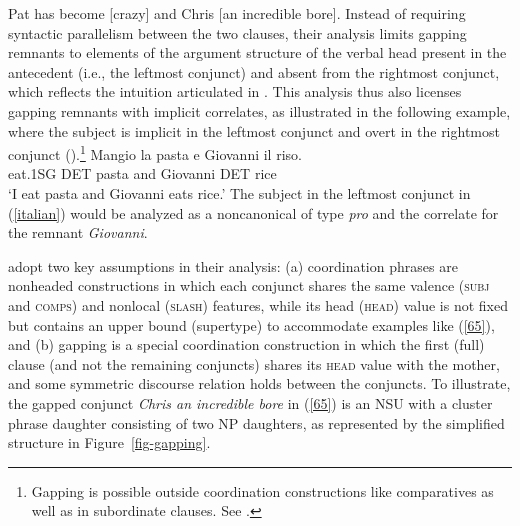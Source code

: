 \ea Pat has become [crazy] and Chris [an incredible bore]. \citep[248]{Abeille2014}  \label{65}\z
%
Instead of requiring %
syntactic parallelism between the two clauses, their analysis limits gapping remnants to elements of the argument structure of the verbal head present in the antecedent (i.e., the leftmost conjunct) and absent from the rightmost conjunct, which reflects the intuition articulated in \citet{Hankamer1971}. This analysis thus also licenses gapping remnants with implicit correlates, as illustrated in the
following  example, where the subject is implicit in the leftmost conjunct and overt in the rightmost conjunct (\citealt[251]{Abeille2014}).\footnote{Gapping is possible outside coordination
constructions like comparatives as well as in 
subordinate clauses. See .}
\ea
\label{italian}
\gll Mangio la pasta e Giovanni il riso.\\
eat.\textsc{1SG} \textsc{DET} pasta and Giovanni \textsc{DET} rice\\
\glt `I eat pasta and Giovanni eats rice.'
\z
%
The subject in the leftmost conjunct in (\ref{italian}) would be analyzed as a noncanonical  of type {\it pro} and the correlate for the remnant {\it Giovanni}. %

\citet{Abeille2014} adopt two key assumptions in their analysis: (a) coordination phrases are nonheaded constructions in which each conjunct shares the same
valence (\textsc{subj} and \textsc{comps}) and nonlocal (\textsc{slash}) features, while
 its head (\textsc{head}) value is not fixed but contains an upper bound (supertype) to accommodate examples like (\ref{65}), and (b) gapping is a special coordination construction in which the first (full) clause (and not the remaining conjuncts) shares its \textsc{head} value with the mother,  
 and some symmetric discourse relation holds between the conjuncts. 
 To illustrate, the gapped conjunct \emph{Chris an incredible bore} in (\ref{65}) is an NSU with a
 cluster phrase daughter consisting of two NP daughters, as represented by the simplified structure
 in Figure~\ref{fig-gapping}. 
 
